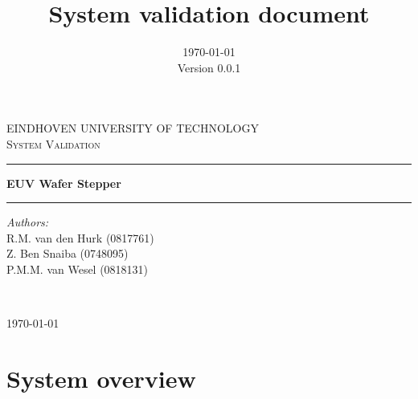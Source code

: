 \documentclass[12pt]{report}
\title{System validation document}
\date{\today \\ Version 0.0.1}
\begin{document}
	\begin{titlepage}
		\begin{center}
			\textsc{\Large EINDHOVEN UNIVERSITY OF TECHNOLOGY}\\[1.5cm]
			
			\textsc{\Large System Validation}\\[0.8cm]
			\hrule
			\vspace{0.5cm}
			{ \huge \bfseries EUV Wafer Stepper \\[0.4cm] }
			\hrule
			\vspace{1.5cm}
			\noindent
			\begin{minipage}[t]{0.5\textwidth}
				\begin{flushleft} \large
					\emph{Authors:}\\
					R.M. van den Hurk (0817761)\\
					Z. Ben Snaiba (0748095)\\
					P.M.M. van Wesel (0818131)\\
				\end{flushleft}
			\end{minipage}\\
			\vspace{5cm}
			\begin{minipage}[t][8cm]{0.3\textwidth}
				\begin{flushright} \large
					\today
				\end{flushright}
			\end{minipage}
			
			\vfill
			
		\end{center}
	\end{titlepage}
	
	\tableofcontents
	
	\chapter{System overview}
	
\end{document}
